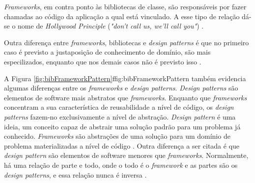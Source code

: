 \par
\indent \textit{Frameworks}, em contra ponto às bibliotecas de classe, são responsáveis por fazer chamadas ao código da aplicação a qual está vinculado. A esse tipo de relação dá-se o nome de \textit{Hollywood Principle} (\textit{"don't call us, we'll call you"}) \cite{sauve2006}.
\par
\indent Outra diferença entre \textit{frameworks}, bibliotecas e \textit{design patterns} é que no  primeiro caso é previsto a justaposição de conhecimento de domínio, são mais especilizados, enquanto que nos demais casos não é previsto isso \cite{sauve2006}.
\par
\indent A Figura \ref{fig:bibFrameworkPattern}f{fig:bibFrameworkPattern} também evidencia algumas diferenças entre os \textit{frameworks} e \textit{design patterns}. \textit{Design patterns} são elementos de software mais abstratos que \textit{frameworks}. Enquanto que \textit{frameworks} concentram a sua característica de reusabilidade a nível de código, os \textit{design patterns} fazem-no exclusivamente a nível de abstração. \textit{Design pattern} é uma ideia, um conceito capaz de abstrair uma solução padrão para um problema já conhecido. \textit{Frameworks} são abstrações de uma solução para um domínio de problema materializadas a nível de código \cite{sauve2006}. Outra diferença a ser citada é que \textit{design pattern} são elementos de software menores que \textit{frameworks}. Normalmente, há uma relação de parte e todo, onde o todo é o \textit{framework} e as partes são os \textit{design patterns}, e essa relação nunca é inversa \cite{sauve2006}.

